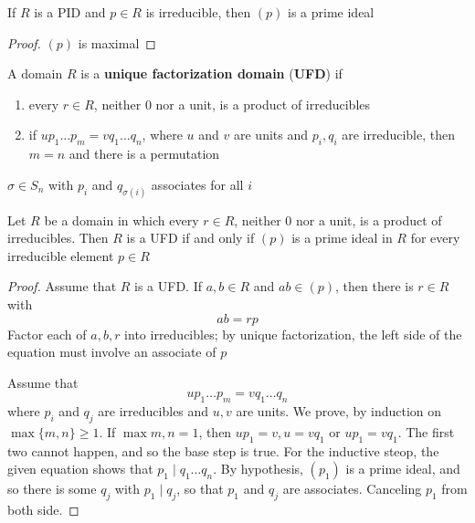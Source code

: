 \documentclass[11pt]{article}
\begin{document}
\begin{corollary}[]
If \(R\) is a PID and \(p\in R\) is irreducible, then \((p)\) is a prime ideal
\end{corollary}

\begin{proof}
\((p)\) is maximal
\end{proof}

\begin{definition}[]
A domain \(R\) is a \textbf{unique factorization domain} (\textbf{UFD}) if
\begin{enumerate}
\item every \(r\in R\), neither 0 nor a unit, is a product of irreducibles
\item if \(up_1\dots p_m=vq_1\dots q_n\), where \(u\) and \(v\) are units and
\(p_i,q_i\) are irreducible, then \(m=n\) and there is a permutation
\end{enumerate}
\(\sigma\in S_n\) with \(p_i\) and \(q_{\sigma(i)}\) associates for all \(i\)
\end{definition}

\begin{proposition}[]
Let \(R\) be a domain in which every \(r\in R\), neither 0 nor a unit, is a
product of irreducibles. Then \(R\) is a UFD if and only if \((p)\) is a prime
ideal in \(R\) for every irreducible element \(p\in R\)
\end{proposition}

\begin{proof}
Assume that \(R\) is a UFD. If \(a,b\in R\) and \(ab\in(p)\), then there is
\(r\in R\) with
\begin{equation*}
ab=rp
\end{equation*}
Factor each of \(a,b,r\) into irreducibles; by unique factorization, the left
side of the equation must involve an associate of \(p\)

Assume that 
\begin{equation*}
up_1\dots p_m=vq_1\dots q_n
\end{equation*}
where \(p_i\) and \(q_j\) are irreducibles and \(u,v\) are units. We prove,
by induction on \(\max\{m,n\}\ge1\). If \(\max{m,n}=1\), then 
\(up_1=v,u=vq_1\) or \(up_1=vq_1\). The first two cannot happen, and so the
base step is true. For the inductive steop, the given equation shows that 
\(p_1\mid q_1\dots q_n\). By hypothesis, \((p_1)\) is a prime ideal, and so
there is some \(q_j\) with \(p_1\mid q_j\), so that \(p_1\) and \(q_j\) are
associates. Canceling \(p_1\) from both side.
\end{proof}
\end{document}
